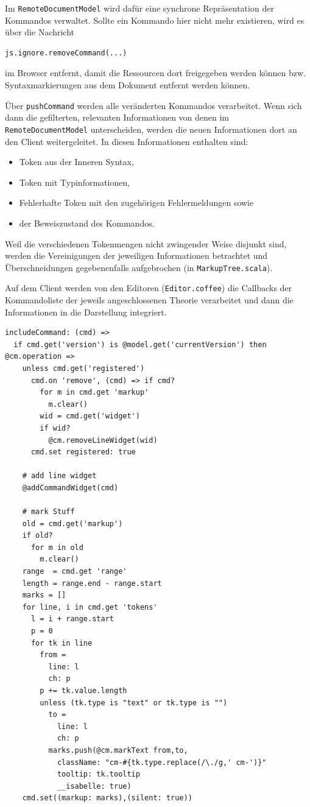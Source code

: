 Im \texttt{RemoteDocumentModel} wird dafür eine synchrone Repräsentation der Kommandos verwaltet.
Sollte ein Kommando hier nicht mehr existieren, wird es über die Nachricht
\begin{lstlisting}
js.ignore.removeCommand(...)
\end{lstlisting}
im Browser entfernt, damit die Ressourcen dort freigegeben
werden können bzw. Syntaxmarkierungen aus dem Dokument entfernt werden können.

Über \texttt{pushCommand} werden alle veränderten Kommandos verarbeitet. Wenn sich dann die
gefilterten, relevanten Informationen von denen im \texttt{RemoteDocumentModel} unterscheiden,
werden die neuen Informationen dort an den Client weitergeleitet. In diesen Informationen enthalten
sind:

\begin{itemize}
  \item Token aus der Inneren Syntax,
  \item Token mit Typinformationen,
  \item Fehlerhafte Token mit den zugehörigen Fehlermeldungen sowie
  \item der Beweiszustand des Kommandos.
\end{itemize}

Weil die verschiedenen Tokenmengen nicht zwingender Weise disjunkt sind, werden die Vereinigungen
der jeweiligen Informationen betrachtet und Überschneidungen gegebenenfalls aufgebrochen (in
\texttt{MarkupTree.scala}).

Auf dem Client werden von den Editoren (\texttt{Editor.coffee}) die Callbacks der Kommandoliste der
jeweils angeschlossenen Theorie verarbeitet und dann die Informationen in die Darstellung
integriert.

\begin{lstlisting}
includeCommand: (cmd) => 
  if cmd.get('version') is @model.get('currentVersion') then @cm.operation =>
    unless cmd.get('registered')      
      cmd.on 'remove', (cmd) => if cmd?
        for m in cmd.get 'markup'
          m.clear()
        wid = cmd.get('widget')
        if wid?
          @cm.removeLineWidget(wid)
      cmd.set registered: true

    # add line widget
    @addCommandWidget(cmd)

    # mark Stuff
    old = cmd.get('markup')
    if old?
      for m in old
        m.clear()
    range  = cmd.get 'range'
    length = range.end - range.start
    marks = []
    for line, i in cmd.get 'tokens'
      l = i + range.start
      p = 0
      for tk in line
        from = 
          line: l
          ch: p
        p += tk.value.length
        unless (tk.type is "text" or tk.type is "")
          to =
            line: l
            ch: p              
          marks.push(@cm.markText from,to,
            className: "cm-#{tk.type.replace(/\./g,' cm-')}"
            tooltip: tk.tooltip
            __isabelle: true)
    cmd.set((markup: marks),(silent: true))
\end{lstlisting}



